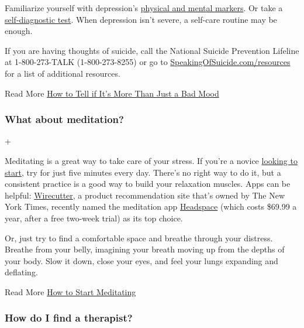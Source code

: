 Familiarize yourself with depression's
\href{https://www.mayoclinic.org/diseases-conditions/depression/expert-answers/clinical-depression/faq-20057770}{physical
and mental markers}. Or take a
\href{https://www.med.umich.edu/1info/FHP/practiceguides/depress/phq-9.pdf}{self-diagnostic
test}. When depression isn't severe, a self-care routine may be enough.

If you are having thoughts of suicide, call the National Suicide
Prevention Lifeline at 1-800-273-TALK (1-800-273-8255) or go to
\href{http://speakingofsuicide.com/resources}{SpeakingOfSuicide.com/resources}
for a list of additional resources.

 Read More
\href{https://www.nytimes.com/2020/05/21/well/coronavirus-depression.html}{How
to Tell if It's More Than Just a Bad Mood}

\hypertarget{what-about-meditation}{%
\subsubsection{What about meditation?}\label{what-about-meditation}}

+

Meditating is a great way to take care of your stress. If you're a
novice
\href{https://www.nytimes.com/2020/06/22/at-home/how-to-start-meditating.html}{looking
to start}, try for just five minutes every day. There's no right way to
do it, but a consistent practice is a good way to build your relaxation
muscles. Apps can be helpful:
\href{https://www.nytimes.com/wirecutter/}{Wirecutter}, a product
recommendation site that's owned by The New York Times, recently named
the meditation app \href{https://www.headspace.com/}{Headspace} (which
costs \$69.99 a year, after a free two-week trial) as its top choice.

Or, just try to find a comfortable space and breathe through your
distress. Breathe from your belly, imagining your breath moving up from
the depths of your body. Slow it down, close your eyes, and feel your
lungs expanding and deflating.

 Read More
\href{https://www.nytimes.com/2020/06/22/at-home/how-to-start-meditating.html}{How
to Start Meditating}

\hypertarget{how-do-i-find-a-therapist}{%
\subsubsection{How do I find a
therapist?}\label{how-do-i-find-a-therapist}}

